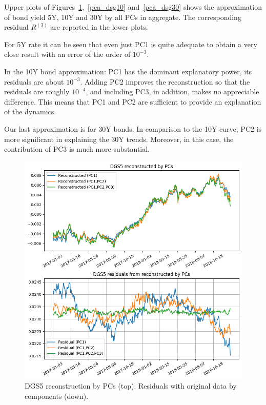 Upper plots of Figures~\ref{fig:pca_dsg5},~\ref{pca_dsg10} and~\ref{pca_dsg30} shows the approximation of bond yield 5Y, 10Y and 30Y by all PCs in aggregate.
The corresponding residual $R^{(3)}$ are reported in the lower plots.

For 5Y rate it can be seen that even just PC1 is quite adequate to obtain a very close result with an error of the order of $10^{-3}$.

In the 10Y bond approximation: PC1 has the dominant explanatory power, its residuals are about $10^{-3}$. Adding PC2 improves the reconstruction so that the residuals are roughly $10^{-4}$, and including PC3, in addition, makes no appreciable difference. This means that PC1 and PC2 are sufficient to provide an explanation of the dynamics.

Our last approximation is for 30Y bonds. In comparison to the 10Y curve, PC2 is more significant in explaining the 30Y trends. Moreover, in this case, the contribution of PC3 is much more substantial.

\begin{figure}[hp]
	\centering
	\includegraphics[width=0.7\linewidth]{figures/dgs5_reco}
	\caption{DGS5 reconstruction by PCs (top). Residuals with original data by components (down).}
	\label{fig:pca_dsg5}
\end{figure}

